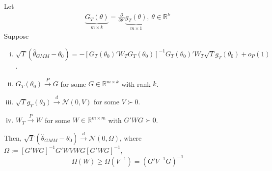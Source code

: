 \documentclass[11pt]{elegantbook}
\begin{document}
\begin{lemma}
    Let
    \begin{equation}
        \begin{aligned}
            \underbrace{G_T(\theta)}_{m\times k}= \frac{\partial }{\partial \theta'} \underbrace{g_T(\theta)}_{m\times 1},\ \theta\in \mathbb{R}^k
        \end{aligned}
        \nonumber
    \end{equation}
    Suppose
    \begin{enumerate}[(i).]
        \item $\sqrt{T}\left(\hat{\theta}_{GMM}-\theta_0\right)= -\left[G_T(\theta_0)'W_TG_T(\theta_0)\right]^{-1}G_T(\theta_0)'W_T\sqrt{T}g_T(\theta_0)+o_P(1)$.
        \item $G_T(\theta_0) \stackrel{P}{\longrightarrow} G$ for some $G\in \mathbb{R}^{m\times k}$ with rank $k$.
        \item $\sqrt{T}g_T(\theta_0)\stackrel{d}{\longrightarrow} \mathcal{N}\left(0,V\right)$ for some $V\succ 0$.
        \item $W_T\stackrel{P}{\longrightarrow} W$ for some $W\in \mathbb{R}^{m\times m}$ with $G'WG\succ 0$.
    \end{enumerate}
    Then, $\sqrt{T}\left(\hat{\theta}_{GMM}-\theta_0\right)\stackrel{d}{\longrightarrow} \mathcal{N}\left(0,\Omega\right)$, where $\Omega:=\left[G'WG\right]^{-1}G'WVWG\left[G'WG\right]^{-1}$, $$\Omega(W)\geq \Omega(V^{-1})=(G'V^{-1}G)^{-1}$$
\end{lemma}
\end{document}
